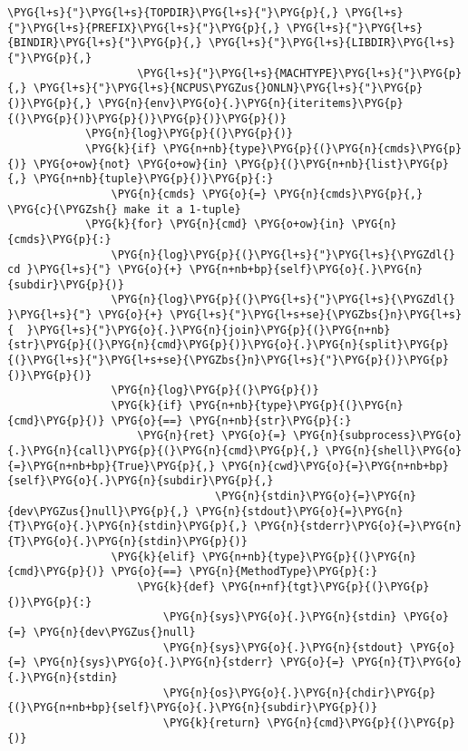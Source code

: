 \begin{Verbatim}[commandchars=\\\{\}]
                    \PYG{l+s}{"}\PYG{l+s}{TOPDIR}\PYG{l+s}{"}\PYG{p}{,} \PYG{l+s}{"}\PYG{l+s}{PREFIX}\PYG{l+s}{"}\PYG{p}{,} \PYG{l+s}{"}\PYG{l+s}{BINDIR}\PYG{l+s}{"}\PYG{p}{,} \PYG{l+s}{"}\PYG{l+s}{LIBDIR}\PYG{l+s}{"}\PYG{p}{,}
                    \PYG{l+s}{"}\PYG{l+s}{MACHTYPE}\PYG{l+s}{"}\PYG{p}{,} \PYG{l+s}{"}\PYG{l+s}{NCPUS\PYGZus{}ONLN}\PYG{l+s}{"}\PYG{p}{)}\PYG{p}{,} \PYG{n}{env}\PYG{o}{.}\PYG{n}{iteritems}\PYG{p}{(}\PYG{p}{)}\PYG{p}{)}\PYG{p}{)}\PYG{p}{)}
            \PYG{n}{log}\PYG{p}{(}\PYG{p}{)}
            \PYG{k}{if} \PYG{n+nb}{type}\PYG{p}{(}\PYG{n}{cmds}\PYG{p}{)} \PYG{o+ow}{not} \PYG{o+ow}{in} \PYG{p}{(}\PYG{n+nb}{list}\PYG{p}{,} \PYG{n+nb}{tuple}\PYG{p}{)}\PYG{p}{:}
                \PYG{n}{cmds} \PYG{o}{=} \PYG{n}{cmds}\PYG{p}{,} \PYG{c}{\PYGZsh{} make it a 1-tuple}
            \PYG{k}{for} \PYG{n}{cmd} \PYG{o+ow}{in} \PYG{n}{cmds}\PYG{p}{:}
                \PYG{n}{log}\PYG{p}{(}\PYG{l+s}{"}\PYG{l+s}{\PYGZdl{} cd }\PYG{l+s}{"} \PYG{o}{+} \PYG{n+nb+bp}{self}\PYG{o}{.}\PYG{n}{subdir}\PYG{p}{)}
                \PYG{n}{log}\PYG{p}{(}\PYG{l+s}{"}\PYG{l+s}{\PYGZdl{} }\PYG{l+s}{"} \PYG{o}{+} \PYG{l+s}{"}\PYG{l+s+se}{\PYGZbs{}n}\PYG{l+s}{  }\PYG{l+s}{"}\PYG{o}{.}\PYG{n}{join}\PYG{p}{(}\PYG{n+nb}{str}\PYG{p}{(}\PYG{n}{cmd}\PYG{p}{)}\PYG{o}{.}\PYG{n}{split}\PYG{p}{(}\PYG{l+s}{"}\PYG{l+s+se}{\PYGZbs{}n}\PYG{l+s}{"}\PYG{p}{)}\PYG{p}{)}\PYG{p}{)}
                \PYG{n}{log}\PYG{p}{(}\PYG{p}{)}
                \PYG{k}{if} \PYG{n+nb}{type}\PYG{p}{(}\PYG{n}{cmd}\PYG{p}{)} \PYG{o}{==} \PYG{n+nb}{str}\PYG{p}{:}
                    \PYG{n}{ret} \PYG{o}{=} \PYG{n}{subprocess}\PYG{o}{.}\PYG{n}{call}\PYG{p}{(}\PYG{n}{cmd}\PYG{p}{,} \PYG{n}{shell}\PYG{o}{=}\PYG{n+nb+bp}{True}\PYG{p}{,} \PYG{n}{cwd}\PYG{o}{=}\PYG{n+nb+bp}{self}\PYG{o}{.}\PYG{n}{subdir}\PYG{p}{,}
                                \PYG{n}{stdin}\PYG{o}{=}\PYG{n}{dev\PYGZus{}null}\PYG{p}{,} \PYG{n}{stdout}\PYG{o}{=}\PYG{n}{T}\PYG{o}{.}\PYG{n}{stdin}\PYG{p}{,} \PYG{n}{stderr}\PYG{o}{=}\PYG{n}{T}\PYG{o}{.}\PYG{n}{stdin}\PYG{p}{)}
                \PYG{k}{elif} \PYG{n+nb}{type}\PYG{p}{(}\PYG{n}{cmd}\PYG{p}{)} \PYG{o}{==} \PYG{n}{MethodType}\PYG{p}{:}
                    \PYG{k}{def} \PYG{n+nf}{tgt}\PYG{p}{(}\PYG{p}{)}\PYG{p}{:}
                        \PYG{n}{sys}\PYG{o}{.}\PYG{n}{stdin} \PYG{o}{=} \PYG{n}{dev\PYGZus{}null}
                        \PYG{n}{sys}\PYG{o}{.}\PYG{n}{stdout} \PYG{o}{=} \PYG{n}{sys}\PYG{o}{.}\PYG{n}{stderr} \PYG{o}{=} \PYG{n}{T}\PYG{o}{.}\PYG{n}{stdin}
                        \PYG{n}{os}\PYG{o}{.}\PYG{n}{chdir}\PYG{p}{(}\PYG{n+nb+bp}{self}\PYG{o}{.}\PYG{n}{subdir}\PYG{p}{)}
                        \PYG{k}{return} \PYG{n}{cmd}\PYG{p}{(}\PYG{p}{)}

\end{Verbatim}
